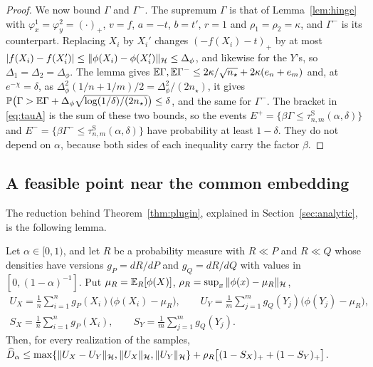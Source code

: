 \begin{proof}
We now bound $\Gamma$ and $\Gamma^-$. The supremum $\Gamma$ is that of Lemma~\ref{lem:hinge} with
$\varphi^1_x=\varphi^2_y=(\cdot)_+$, $v=f$, $a=-t$, $b=t'$, $r=1$ and $\rho_1=\rho_2=\kappa$, and $\Gamma^-$ is its
counterpart. Replacing $X_i$ by $X_i'$ changes $(-f(X_i)-t)_+$ by at most
$|f(X_i)-f(X_i')|\le\|\phi(X_i)-\phi(X_i')\|_{\mathcal{H}}\le\Delta_\phi$, and likewise for the $Y$'s, so
$\Delta_1=\Delta_2=\Delta_\phi$. The lemma gives $\mathbb{E}\Gamma,\mathbb{E}\Gamma^-\le2\kappa/\sqrt{n_\star}+2\kappa(e_n+e_m)$ and, at $e^{-\chi}=\delta$, as $\Delta_\phi^2(1/n+1/m)/2=\Delta_\phi^2/(2n_\star)$, it gives
$\mathbb{P}\big(\Gamma>\mathbb{E}\Gamma+\Delta_\phi\sqrt{\log(1/\delta)/(2n_\star)}\big)\le\delta$, and the same for $\Gamma^-$. The
bracket in \eqref{eq:tauA} is the sum of these two bounds, so the events $E^+=\{\beta\Gamma\le\tau^{\mathrm S}_{n,m}(\alpha,\delta)\}$
and $E^-=\{\beta\Gamma^-\le\tau^{\mathrm S}_{n,m}(\alpha,\delta)\}$ have probability at least $1-\delta$. They do not
depend on $\alpha$, because both sides of each inequality carry the factor $\beta$.
\end{proof}

\subsection{A feasible point near the common embedding}

The reduction behind Theorem~\ref{thm:plugin}, explained in Section~\ref{sec:analytic}, is the following lemma.

\begin{lemma}
\label{lem:plugin}
Let $\alpha\in[0,1)$, and let $R$ be a probability measure with $R\ll P$ and $R\ll Q$ whose densities have versions
$g_P=dR/dP$ and $g_Q=dR/dQ$ with values in $[0,(1-\alpha)^{-1}]$. Put $\mu_R=\mathbb{E}_R[\phi(X)]$,
$\rho_R=\sup_x\|\phi(x)-\mu_R\|_{\mathcal{H}}$,
\begin{gather*}
U_X=\frac1n\sum_{i=1}^ng_P(X_i)\big(\phi(X_i)-\mu_R\big),\qquad
U_Y=\frac1m\sum_{j=1}^mg_Q(Y_j)\big(\phi(Y_j)-\mu_R\big),\\
S_X=\frac1n\sum_{i=1}^ng_P(X_i),\qquad
S_Y=\frac1m\sum_{j=1}^mg_Q(Y_j).
\end{gather*}
Then, for every realization of the samples,
$\widehat D_\alpha\le\max\{\|U_X-U_Y\|_{\mathcal{H}},\|U_X\|_{\mathcal{H}},\|U_Y\|_{\mathcal{H}}\}+\rho_R\big[(1-S_X)_++(1-S_Y)_+\big]$.
\end{lemma}

